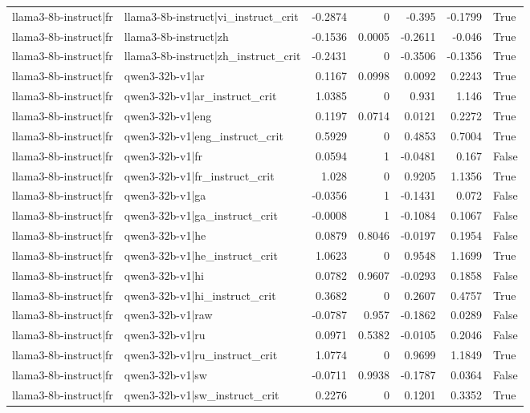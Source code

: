 \begin{table}
\begin{tabular}{l l r r r r l}
llama3-8b-instruct|fr & llama3-8b-instruct|vi_instruct_crit & -0.2874 & 0 & -0.395 & -0.1799 & True \\
llama3-8b-instruct|fr & llama3-8b-instruct|zh & -0.1536 & 0.0005 & -0.2611 & -0.046 & True \\
llama3-8b-instruct|fr & llama3-8b-instruct|zh_instruct_crit & -0.2431 & 0 & -0.3506 & -0.1356 & True \\
llama3-8b-instruct|fr & qwen3-32b-v1|ar & 0.1167 & 0.0998 & 0.0092 & 0.2243 & True \\
llama3-8b-instruct|fr & qwen3-32b-v1|ar_instruct_crit & 1.0385 & 0 & 0.931 & 1.146 & True \\
llama3-8b-instruct|fr & qwen3-32b-v1|eng & 0.1197 & 0.0714 & 0.0121 & 0.2272 & True \\
llama3-8b-instruct|fr & qwen3-32b-v1|eng_instruct_crit & 0.5929 & 0 & 0.4853 & 0.7004 & True \\
llama3-8b-instruct|fr & qwen3-32b-v1|fr & 0.0594 & 1 & -0.0481 & 0.167 & False \\
llama3-8b-instruct|fr & qwen3-32b-v1|fr_instruct_crit & 1.028 & 0 & 0.9205 & 1.1356 & True \\
llama3-8b-instruct|fr & qwen3-32b-v1|ga & -0.0356 & 1 & -0.1431 & 0.072 & False \\
llama3-8b-instruct|fr & qwen3-32b-v1|ga_instruct_crit & -0.0008 & 1 & -0.1084 & 0.1067 & False \\
llama3-8b-instruct|fr & qwen3-32b-v1|he & 0.0879 & 0.8046 & -0.0197 & 0.1954 & False \\
llama3-8b-instruct|fr & qwen3-32b-v1|he_instruct_crit & 1.0623 & 0 & 0.9548 & 1.1699 & True \\
llama3-8b-instruct|fr & qwen3-32b-v1|hi & 0.0782 & 0.9607 & -0.0293 & 0.1858 & False \\
llama3-8b-instruct|fr & qwen3-32b-v1|hi_instruct_crit & 0.3682 & 0 & 0.2607 & 0.4757 & True \\
llama3-8b-instruct|fr & qwen3-32b-v1|raw & -0.0787 & 0.957 & -0.1862 & 0.0289 & False \\
llama3-8b-instruct|fr & qwen3-32b-v1|ru & 0.0971 & 0.5382 & -0.0105 & 0.2046 & False \\
llama3-8b-instruct|fr & qwen3-32b-v1|ru_instruct_crit & 1.0774 & 0 & 0.9699 & 1.1849 & True \\
llama3-8b-instruct|fr & qwen3-32b-v1|sw & -0.0711 & 0.9938 & -0.1787 & 0.0364 & False \\
llama3-8b-instruct|fr & qwen3-32b-v1|sw_instruct_crit & 0.2276 & 0 & 0.1201 & 0.3352 & True \\

\end{tabular}
\end{table}
